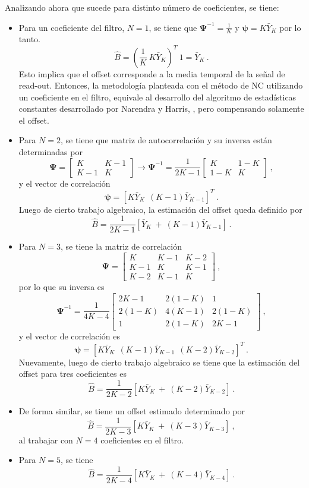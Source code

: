 Analizando ahora que sucede para distinto número de coeficientes, se tiene:
\begin{itemize}
\item Para un coeficiente del filtro, $N=1$, se tiene que $\bm{\Psi}^{-1}=\frac{1}{K}$ y $\bm{\psi}=K\bar{Y}_{K}$ por lo tanto. 
$$\hat{B} = \left(\frac{1}{K} ~ K\bar{Y}_{K}\right)^T~ 1 = \bar{Y}_{K}~.$$
Esto implica que el offset corresponde a la media temporal de la señal de read-out. Entonces, la metodología planteada con el método de \ac{NC} utilizando un coeficiente en el filtro, equivale al desarrollo del algoritmo de estadísticas constantes desarrollado por Narendra y Harris, \cite{narendra81,harris-cs,harris97analog}, pero compensando solamente el offset.

\item Para $N=2$, se tiene que matriz de autocorrelación y su inversa están determinadas por
$$\bm{\Psi} = \left[\begin{array}{cc}K & K-1\\K-1 & K\end{array}\right]\rightarrow \bm{\Psi}^{-1} = \frac{1}{2K-1} \left[\begin{array}{cc} K & 1-K\\1-K & K \end{array}\right]~,$$
y el vector de correlación
$$\bm{\psi} = \left[K\bar{Y}_{K}~~(K-1)\bar{Y}_{K-1}\right]^T~.$$
Luego de cierto trabajo algebraico, la estimación del offset queda definido por
$$\hat{B} = \frac{1}{2K-1}\left[\bar{Y}_{K} ~+~ (K-1)\bar{Y}_{K-1}\right]~.$$

\item Para $N=3$, se tiene la matriz de correlación
$$\bm{\Psi} = \left[\begin{array}{ccc}K & K-1 & K-2\\K-1 & K & K-1\\K-2 & K-1 & K\end{array}\right]~,$$
por lo que su inversa es
$$\bm{\Psi}^{-1} = \frac{1}{4K-4}\left[\begin{array}{ccc}2K-1 & 2(1-K) & 1\\2(1-K) & 4(K-1) & 2(1-K)\\1 & 2(1-K) & 2K-1\end{array}\right]~,$$
y el vector de correlación es
$$\bm{\psi} = \left[K\bar{Y}_{K}~~(K-1)\bar{Y}_{K-1}~~(K-2)\bar{Y}_{K-2}\right]^T~.$$
Nuevamente, luego de cierto trabajo algebraico se tiene que la estimación del offset para tres coeficientes es
$$\hat{B} = \frac{1}{2K-2}\left[K\bar{Y}_{K}~+~(K-2)\bar{Y}_{K-2}\right]~.$$

\item De forma similar, se tiene un offset estimado determinado por
$$\hat{B} = \frac{1}{2K-3}\left[K\bar{Y}_{K}~+~(K-3)\bar{Y}_{K-3}\right]~,$$
al trabajar con $N=4$ coeficientes en el filtro.

\item Para $N=5$, se tiene
$$\hat{B} = \frac{1}{2K-4}\left[K\bar{Y}_{K}~+~(K-4)\bar{Y}_{K-4}\right]~.$$
\end{itemize}

